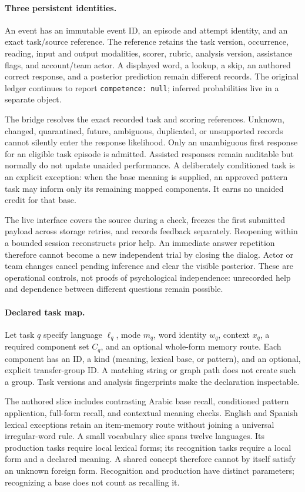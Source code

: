 \documentclass{article}
\begin{document}
\paragraph{Three persistent identities.}
An event has an immutable event ID, an episode and attempt identity, and an
exact task/source reference. The reference retains the task version,
occurrence, reading, input and output modalities, scorer, rubric, analysis
version, assistance flags, and account/team actor. A displayed word, a lookup,
a skip, an authored correct response, and a posterior prediction remain
different records. The original ledger continues to report
\texttt{competence: null}; inferred probabilities live in a separate object.

The bridge resolves the exact recorded task and scoring references. Unknown,
changed, quarantined, future, ambiguous, duplicated, or unsupported records
cannot silently enter the response likelihood. Only an unambiguous first
response for an eligible task episode is admitted. Assisted responses remain
auditable but normally do not update unaided performance. A deliberately
conditioned task is an explicit exception: when the base meaning is supplied,
an approved pattern task may inform only its remaining mapped components.
It earns no unaided credit for that base.

The live interface covers the source during a check, freezes the first
submitted payload across storage retries, and records feedback separately.
Reopening within a bounded session reconstructs prior help. An immediate
answer repetition therefore cannot become a new independent trial by closing
the dialog. Actor or team changes cancel pending inference and clear the
visible posterior. These are operational controls, not proofs of psychological
independence: unrecorded help and dependence between different questions remain
possible.

\paragraph{Declared task map.}
Let task \(q\) specify language \(\ell_q\), mode \(m_q\), word identity \(w_q\),
context \(x_q\), a required component set \(C_q\), and an optional whole-form
memory route. Each component has an ID, a kind (meaning, lexical base, or
pattern), and an optional, explicit transfer-group ID. A matching string or
graph path does not create such a group. Task versions and analysis
fingerprints make the declaration inspectable.

The authored slice includes contrasting Arabic base recall, conditioned
pattern application, full-form recall, and contextual meaning checks. English
and Spanish lexical exceptions retain an item-memory route without joining a
universal irregular-word rule. A small vocabulary slice spans twelve
languages. Its production tasks require local lexical forms; its recognition
tasks require a local form and a declared meaning. A shared concept therefore
cannot by itself satisfy an unknown foreign form. Recognition and production
have distinct parameters; recognizing a base does not count as recalling it.
\end{document}
